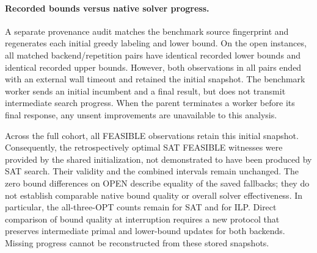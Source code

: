 \paragraph{Recorded bounds versus native solver progress.}
A separate provenance audit matches the benchmark source fingerprint and
regenerates each initial greedy labeling and lower bound. On the
\BoundsOpenInstances{} open instances, all \BoundsOpenPairs{} matched
backend/repetition pairs have identical recorded lower bounds and identical
recorded upper bounds. However, both observations in all
\BoundsOpenFallbackPairs{} pairs ended with an external wall timeout and
retained the initial snapshot. The benchmark worker sends an initial incumbent
and a final result, but does not transmit intermediate search progress.
When the parent terminates a worker before its final response, any unsent
improvements are unavailable to this analysis.

\begin{table}[htbp]
\centering\small
\caption{Recorded bound comparisons in archived v1.}
\label{tab:recorded-bound-comparison}

\end{table}

Across the full cohort, all \BoundsFallbackObservations{} FEASIBLE
observations retain this initial snapshot. Consequently, the
\GapSATFeasibleOptimal{} retrospectively optimal SAT FEASIBLE witnesses were
provided by the shared initialization, not demonstrated to have been produced
by SAT search. Their validity and the combined intervals remain unchanged.
The zero bound differences on OPEN describe equality of the saved fallbacks;
they do not establish comparable native bound quality or overall solver
effectiveness. In particular, the all-three-OPT counts remain
\ConfirmSATStable{} for SAT and \ConfirmILPStable{} for ILP.
Direct comparison of bound quality at interruption requires a new protocol
that preserves intermediate primal and lower-bound updates for both backends.
Missing progress cannot be reconstructed from these stored snapshots.
\FloatBarrier
